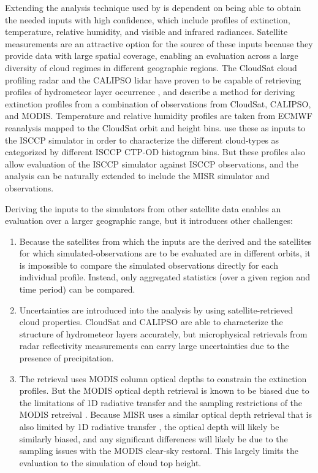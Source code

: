 \documentclass[letter]{article}
\begin{document}
Extending the analysis technique used by \cite{mace_et_al_2010} is dependent on being able to obtain the needed inputs with high confidence, which include profiles of extinction, temperature, relative humidity, and visible and infrared radiances. Satellite measurements are an attractive option for the source of these inputs because they provide data with large spatial coverage, enabling an evaluation across a large diversity of cloud regimes in different geographic regions. The CloudSat cloud profiling radar \citep{stephens_et_al_2002} and the CALIPSO lidar \citep{winker_et_al_2007} have proven to be capable of retrieving profiles of hydrometeor layer occurrence \citep{mace_et_al_2009}, and \cite{mace_and_wrenn_2013} describe a method for deriving extinction profiles from a combination of observations from CloudSat, CALIPSO, and MODIS. Temperature and relative humidity profiles are taken from ECMWF reanalysis mapped to the CloudSat orbit and height bins. \cite{mace_and_wrenn_2013} use these as inputs to the ISCCP simulator in order to characterize the different cloud-types as categorized by different ISCCP CTP-OD histogram bins. But these profiles also allow evaluation of the ISCCP simulator against ISCCP observations, and the analysis can be naturally extended to include the MISR simulator and observations.

Deriving the inputs to the simulators from other satellite data enables an evaluation over a larger geographic range, but it introduces other challenges: 
\begin{enumerate}
\item Because the satellites from which the inputs are the derived and the satellites for which simulated-observations are to be evaluated are in different orbits, it is impossible to compare the simulated observations directly for each individual profile. Instead, only aggregated statistics (over a given region and time period) can be compared. 

\item Uncertainties are introduced into the analysis by using satellite-retrieved cloud properties. CloudSat and CALIPSO are able to characterize the structure of hydrometeor layers accurately, but microphysical retrievals from radar reflectivity measurements can carry large uncertainties due to the presence of precipitation. 

\item The \cite{mace_and_wrenn_2013} retrieval uses MODIS column optical depths to constrain the extinction profiles. But the MODIS optical depth retrieval is known to be biased due to the limitations of 1D radiative transfer and the sampling restrictions of the MODIS retreival \citep{pincus_et_al_2012}. Because MISR uses a similar optical depth retrieval that is also limited by 1D radiative transfer \citep{marchand_et_al_2010}, the optical depth will likely be similarly biased, and any significant differences will likely be due to the sampling issues with the MODIS clear-sky restoral. This largely limits the evaluation to the simulation of cloud top height.
\end{enumerate}
\end{document}
